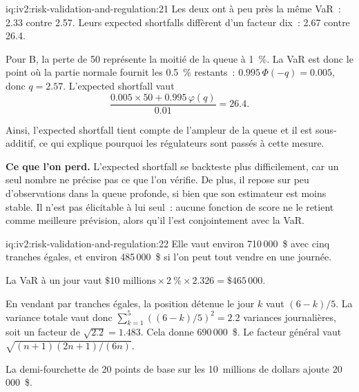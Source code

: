 \begin{solution}{iq:iv2:risk-validation-and-regulation:21}
Les deux ont à peu près la même VaR~: 2.33 contre 2.57. Leurs expected shortfalls diffèrent d'un facteur dix~: 2.67 contre 26.4.

Pour B, la perte de 50 représente la moitié de la queue à 1~\%. La VaR est donc le point où la partie normale fournit les 0.5~\% restants~: $0.995\,\Phi(-q) = 0.005$, donc $q = 2.57$. L'expected shortfall vaut
\[
\frac{0.005 \times 50 + 0.995\,\varphi(q)}{0.01} = 26.4.
\]

Ainsi, l'expected shortfall tient compte de l'ampleur de la queue et il est sous-additif, ce qui explique pourquoi les régulateurs sont passés à cette mesure.

\textbf{Ce que l'on perd.} L'expected shortfall se backteste plus difficilement, car un seul nombre ne précise pas ce que l'on vérifie. De plus, il repose sur peu d'observations dans la queue profonde, si bien que son estimateur est moins stable. Il n'est pas élicitable à lui seul~: aucune fonction de score ne le retient comme meilleure prévision, alors qu'il l'est conjointement avec la VaR.

\end{solution}

\begin{solution}{iq:iv2:risk-validation-and-regulation:22}
Elle vaut environ 710\,000~\$ avec cinq tranches égales, et environ 485\,000~\$ si l'on peut tout vendre en une journée.

La VaR à un jour vaut $\$10 \text{ millions} \times 2~\% \times 2.326 = \$465\,000$.

En vendant par tranches égales, la position détenue le jour $k$ vaut $(6 - k)/5$. La variance totale vaut donc $\sum_{k=1}^{5}((6 - k)/5)^2 = 2.2$ variances journalières, soit un facteur de $\sqrt{2.2} = 1.483$. Cela donne 690\,000~\$. Le facteur général vaut $\sqrt{(n + 1)(2n + 1)/(6n)}$.

La demi-fourchette de 20 points de base sur les 10~millions de dollars ajoute 20\,000~\$.

\end{solution}

